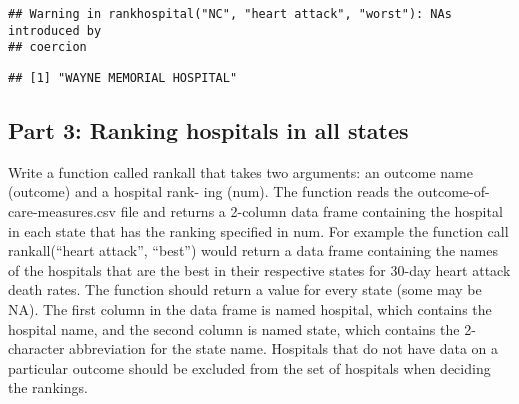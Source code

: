 \documentclass[]{article}
\begin{document}
\begin{verbatim}
## Warning in rankhospital("NC", "heart attack", "worst"): NAs introduced by
## coercion
\end{verbatim}

\begin{verbatim}
## [1] "WAYNE MEMORIAL HOSPITAL"
\end{verbatim}

\subsection{Part 3: Ranking hospitals in all
states}\label{part-3-ranking-hospitals-in-all-states}

Write a function called rankall that takes two arguments: an outcome
name (outcome) and a hospital rank- ing (num). The function reads the
outcome-of-care-measures.csv file and returns a 2-column data frame
containing the hospital in each state that has the ranking specified in
num. For example the function call rankall(``heart attack'', ``best'')
would return a data frame containing the names of the hospitals that are
the best in their respective states for 30-day heart attack death rates.
The function should return a value for every state (some may be NA). The
first column in the data frame is named hospital, which contains the
hospital name, and the second column is named state, which contains the
2-character abbreviation for the state name. Hospitals that do not have
data on a particular outcome should be excluded from the set of
hospitals when deciding the rankings.
\end{document}

